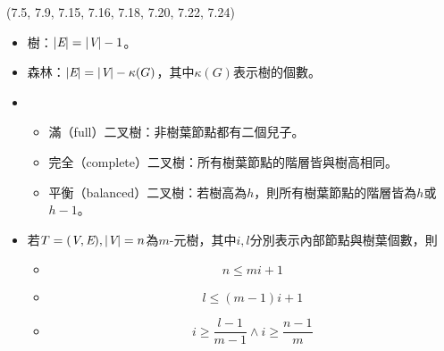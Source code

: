 \item \begin{theorem}{(7.5, 7.9, 7.15, 7.16, 7.18, 7.20, 7.22, 7.24)} \quad\quad
    \begin{itemize}
        \item 樹：$|\textit{E}| = |\textit{V}| - 1$。
        \item 森林：$|\textit{E}| = |\textit{V}| - \kappa(G)$，其中$\kappa(G)$表示樹的個數。
        \item \begin{itemize}
            \item 滿（full）二叉樹：非樹葉節點都有二個兒子。
            \item 完全（complete）二叉樹：所有樹葉節點的階層皆與樹高相同。
            \item 平衡（balanced）二叉樹：若樹高為$h$，則所有樹葉節點的階層皆為$h$或$h - 1$。
        \end{itemize}
        \item 若$T = (\textit{V}, \textit{E}), |\textit{V}| = n$為$m$-元樹，其中$i, l$分別表示內部節點與樹葉個數，則\begin{itemize}
            \item \begin{equation}
                n \le mi + 1
            \end{equation}
            \item \begin{equation}
                l \le (m - 1)i + 1
            \end{equation}
            \item \begin{equation}
                    i \ge \frac{l - 1}{m - 1} \land i \ge \frac{n - 1}{m}
            \end{equation}


\end{itemize}
\end{itemize}
\end{theorem}
